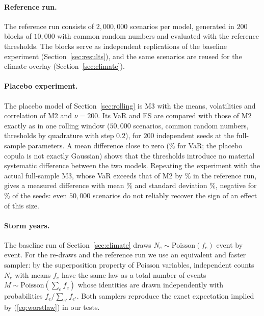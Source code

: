 \paragraph{Reference run.}
The reference run consists of $2{,}000{,}000$ scenarios per model, generated in $200$ blocks of $10{,}000$ with common random numbers and evaluated with the reference thresholds. The blocks serve as independent replications of the baseline experiment (Section~\ref{sec:results}), and the same scenarios are reused for the climate overlay (Section~\ref{sec:climate}).

\paragraph{Placebo experiment.}
The placebo model of Section~\ref{sec:rolling} is M3 with the means, volatilities and correlation of M2 and $\nu=200$. Its VaR and ES are compared with those of M2 exactly as in one rolling window ($50{,}000$ scenarios, common random numbers, thresholds by quadrature with step $0.2$), for $200$ independent seeds at the full-sample parameters. A mean difference close to zero (\% for VaR; the placebo copula is not exactly Gaussian) shows that the thresholds introduce no material systematic difference between the two models. Repeating the experiment with the actual full-sample M3, whose VaR exceeds that of M2 by \% in the reference run, gives a measured difference with mean \% and standard deviation \%, negative for \% of the seeds: even $50{,}000$ scenarios do not reliably recover the sign of an effect of this size.

\paragraph{Storm years.}
The baseline run of Section~\ref{sec:climate} draws $N_e\sim\mathrm{Poisson}(f_e)$ event by event. For the re-draws and the reference run we use an equivalent and faster sampler: by the superposition property of Poisson variables, independent counts $N_e$ with means $f_e$ have the same law as a total number of events $M\sim\mathrm{Poisson}(\sum_ef_e)$ whose identities are drawn independently with probabilities $f_e/\sum_{e'}f_{e'}$. Both samplers reproduce the exact expectation implied by (\ref{eq:worstlaw}) in our tests.

